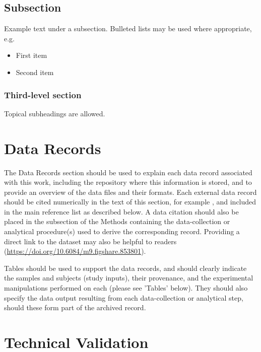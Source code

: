 \documentclass[fleqn,10pt]{wlscirep}
\begin{document}
\subsection*{Subsection}

Example text under a subsection. Bulleted lists may be used where appropriate, e.g.

\begin{itemize}
\item First item
\item Second item
\end{itemize}

\subsubsection*{Third-level section}

Topical subheadings are allowed.



\section*{Data Records}

The Data Records section should be used to explain each data record associated with this
work, including the repository where this information is stored, and to provide an
overview of the data files and their formats. Each external data record should be cited
numerically in the text of this section, for example \cite{Hao:gidmaps:2014}, and
included in the main reference list as described below. A data citation should also be
placed in the subsection of the Methods containing the data-collection or analytical
procedure(s) used to derive the corresponding record. Providing a direct link to the
dataset may also be helpful to readers
(\hyperlink{https://doi.org/10.6084/m9.figshare.853801}{https://doi.org/10.6084/m9.figshare.853801}).

Tables should be used to support the data records, and should clearly indicate the
samples and subjects (study inputs), their provenance, and the experimental
manipulations performed on each (please see 'Tables' below). They should also specify
the data output resulting from each data-collection or analytical step, should these
form part of the archived record.



\section*{Technical Validation}
\end{document}
